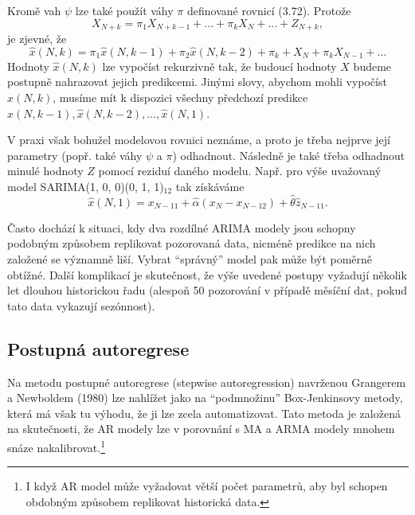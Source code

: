 Kromě vah $\psi$ lze také použít váhy $\pi$ definované rovnicí (3.72). Protože
\begin{equation}
X_{N + k} = \pi_1 X_{N + k - 1} + ... + \pi_k X_N + ... + Z_{N + k},
\end{equation}
je zjevné, že
\begin{equation}
\hat{x}(N, k) = \pi_1 \hat{x}(N, k - 1) + \pi_2 \hat{x}(N, k - 2) + \pi_k + X_N + \pi_k X_{N - 1} + ...
\end{equation}
Hodnoty $\hat{x}(N, k)$ lze vypočíst rekurzivně tak, že budoucí hodnoty $X$ budeme postupně nahrazovat jejich predikcemi. Jinými slovy, abychom mohli vypočíst $\hat{x}(N, k)$, musíme mít k dispozici všechny předchozí predikce $\hat{x}(N, k - 1), \hat{x}(N, k - 2), ..., \hat{x}(N, 1)$.
\bigbreak

V praxi však bohužel modelovou rovnici neznáme, a proto je třeba nejprve její parametry (popř. také váhy $\psi$ a $\pi$) odhadnout. Následně je také třeba odhadnout minulé hodnoty $Z$ pomocí reziduí daného modelu. Např. pro výše uvažovaný model SARIMA(1, 0, 0)(0, 1, 1)$_{12}$ tak získáváme
\begin{equation}
\hat{x}(N, 1) = x_{N - 11} + \hat{\alpha} (x_N - x_{N - 12}) + \hat{\theta} \hat{z}_{N - 11}.
\end{equation}

Často dochází k situaci, kdy dva rozdílné ARIMA modely jsou schopny podobným způsobem replikovat pozorovaná data, nicméně predikce na nich založené se významně liší. Vybrat ``správný'' model pak může být poměrně obtížné. Další komplikací je skutečnost, že výše uvedené postupy vyžadují několik let dlouhou historickou řadu (alespoň 50 pozorování v případě měsíční dat, pokud tato data vykazují sezónnost).

\subsection{Postupná autoregrese}

Na metodu postupné autoregrese (stepwise autoregression) navrženou Grangerem a Newboldem (1980) lze nahlížet jako na ``podmnožinu'' Box-Jenkinsovy metody, která má však tu výhodu, že ji lze zcela automatizovat. Tato metoda je založená na skutečnosti, že AR modely lze v porovnání s MA a ARMA modely mnohem snáze nakalibrovat.\footnote{I když AR model může vyžadovat větší počet parametrů, aby byl schopen obdobným způsobem replikovat historická data.}

